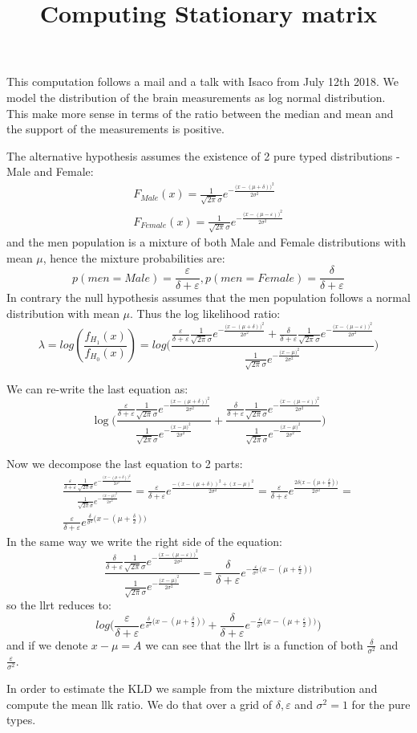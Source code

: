 \documentclass[12pt]{article}
\title{Computing Stationary matrix}
\newcommand{\maleProb}{\frac{\varepsilon}{\delta + \varepsilon}}
\newcommand{\femaleProb}{\frac{\delta}{\delta + \varepsilon}}
\newcommand{\malellk}{\frac{1}{\sqrt{2\pi}\sigma}e^{-\frac{\big(x - (\mu + \delta)\big)^2}{2\sigma^2}}}
\newcommand{\femalellk}{\frac{1}{\sqrt{2\pi}\sigma}e^{-\frac{\big(x - (\mu - \varepsilon)\big)^2}{2\sigma^2}}}
\newcommand{\purellk}{\frac{1}{\sqrt{2\pi}\sigma}e^{-\frac{\big(x - \mu \big)^2}{2\sigma^2}}}
\begin{document}
This computation follows a mail and a talk with Isaco from July 12th 2018. We model the distribution of the brain measurements as log normal distribution. This make more sense in terms of the ratio between the median and mean and the support of the measurements is positive.

The alternative hypothesis assumes the existence of 2 pure typed distributions - Male and Female:
\begin{gather}
F_{Male}(x) = \malellk
\\
F_{Female}(x) = \femalellk
\end{gather}
and the men population is a mixture of both Male and Female distributions with mean $\mu$, hence the mixture probabilities are:
\[
p(men = Male) = \frac{\varepsilon}{\delta + \varepsilon}, 
p(men = Female) = \frac{\delta }{\delta + \varepsilon}
\]
In contrary the null hypothesis assumes that the men population follows a normal distribution with mean $\mu$.
Thus the log likelihood ratio:
\begin{equation}
\lambda = log(\frac{f_{H_1}(x)}{f_{H_0}(x)}) = log\big(\frac{\maleProb \malellk + \femaleProb \femalellk}{\purellk}\big) 
\end{equation}

We can re-write the last equation as:
\begin{equation*}
\log \big(\frac{\maleProb \malellk }{\purellk} + 
\frac{\femaleProb \femalellk }{\purellk} \big)
\end{equation*}

Now we decompose the last equation to 2 parts:
\begin{multline}
\frac{\maleProb \malellk }{\purellk} = \maleProb e^{\frac{-(x - (\mu + \delta))^2 + (x - \mu)^2}{2\sigma^2}} = 
\maleProb e^{\frac{2\delta\big(x - (\mu + \frac{\delta}{2}) \big)}{2 \sigma^2}} = 
\\
\maleProb e^{\frac{\delta}{\sigma^2}\big(x - (\mu + \frac{\delta}{2}) \big)}
\end{multline}
In the same way we write the right side of the equation:
\begin{equation}
\frac{\femaleProb \femalellk }{\purellk} = 
\femaleProb e^{-\frac{\varepsilon}{\sigma^2}\big(x - (\mu + \frac{\varepsilon}{2}) \big)}
\end{equation}
so the llrt reduces to:
\begin{equation}
log \big( 
\maleProb e^{\frac{\delta}{\sigma^2}\big(x - (\mu + \frac{\delta}{2}) \big)}
 +  
\femaleProb e^{-\frac{\varepsilon}{\sigma^2}\big(x - (\mu + \frac{\varepsilon}{2}) \big)}
\big)
\end{equation}
and if we denote $x-\mu = A$ we can see that the llrt is a function of both $\frac{\delta}{\sigma ^2}$ and $\frac{\varepsilon}{\sigma^2}$.

In order to estimate the KLD we sample from the mixture distribution and compute the mean llk ratio. We do that over a grid of $\delta,\varepsilon$ and $\sigma^2 = 1$ for the pure types.
\end{document}
